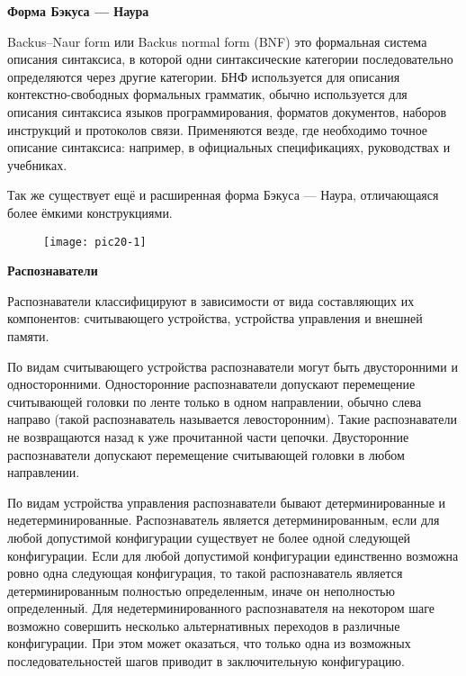\begin{center}{\bfseries Форма Бэкуса — Наура}
\end{center}

\begin{utv}
  Backus–Naur form или Backus normal form (BNF) это формальная система описания синтаксиса, в которой одни синтаксические категории последовательно определяются через другие категории. БНФ используется для описания контекстно-свободных формальных грамматик, обычно используется для описания синтаксиса языков программирования, форматов документов, наборов инструкций и протоколов связи. Применяются везде, где необходимо точное описание синтаксиса: например, в официальных спецификациях, руководствах и учебниках.
\end{utv}

Так же существует ещё и расширенная форма Бэкуса — Наура, отличающаяся более ёмкими конструкциями.

\begin{figure}[h]
  \begin{center}
  \texttt{[image: pic20-1]}
  \end{center}
  \end{figure}

  \begin{center}{\bfseries Распознаватели}
  \end{center}
  
  Распознаватели классифицируют в зависимости от вида составляющих их компонентов: считывающего устройства, устройства управления и внешней памяти.

  По видам считывающего устройства распознаватели могут быть двусторонними и односторонними. Односторонние распознаватели допускают перемещение считывающей головки по ленте только в одном направлении, обычно слева направо (такой распознаватель называется левосторонним). Такие распознаватели не возвращаются назад к уже прочитанной части цепочки. Двусторонние распознаватели допускают перемещение считывающей головки в любом направлении.

  По видам устройства управления распознаватели бывают детерминированные и недетерминированные. Распознаватель является детерминированным, если для любой допустимой конфигурации существует не более одной следующей конфигурации. Если для любой допустимой конфигурации единственно возможна ровно одна следующая конфигурация, то такой распознаватель является детерминированным полностью определенным, иначе он неполностью определенный. Для недетерминированного распознавателя на некотором шаге возможно совершить несколько альтернативных переходов в различные конфигурации. При этом может оказаться, что только одна из возможных последовательностей шагов приводит в заключительную конфигурацию.

